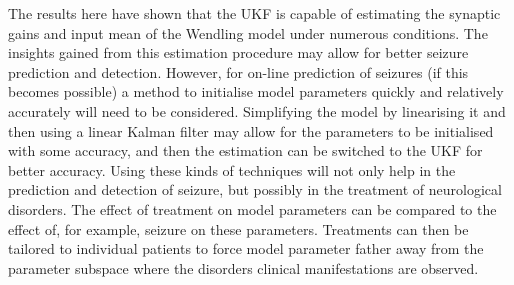 The results here have shown that the UKF is capable of estimating the synaptic gains and input mean of the Wendling model under numerous conditions. The insights gained from this estimation procedure may allow for better seizure prediction and detection. However, for on-line prediction of seizures (if this becomes possible) a method to initialise model parameters quickly and relatively accurately will need to be considered. Simplifying the model by linearising it and then using a linear Kalman  filter may allow for the parameters to be initialised with some accuracy, and then the estimation can be switched to the UKF for better accuracy. Using these kinds of techniques will not only help in the prediction and detection of seizure, but possibly in the treatment of neurological disorders. The effect of treatment on model parameters can be compared to the effect of, for example, seizure on these parameters. Treatments can then be tailored to individual patients to force model parameter father away from the parameter subspace where the disorders clinical manifestations are observed.



